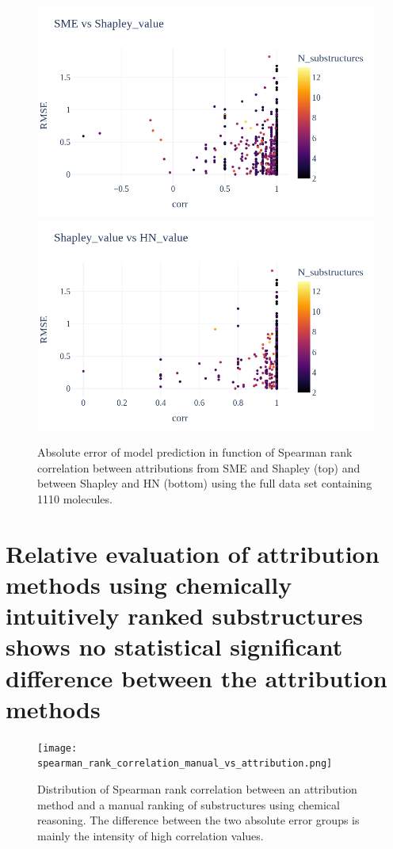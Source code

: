 \begin{figure}[h]
    \centering
    \includegraphics[scale=0.35]{../data/images/esol_rank_vs_AE_SME_Shapley_combined.png}
    \includegraphics[scale=0.35]{../data/images/esol_rank_vs_AE_Shapley_HN_combined.png}
    \caption{Absolute error of model prediction in function of Spearman rank correlation between 
        attributions from SME and Shapley (top) and between Shapley and HN (bottom) using the full 
        data set containing 1110 molecules.
    }
\end{figure}


\section{Relative evaluation of attribution methods using chemically intuitively ranked substructures shows no statistical
significant difference between the attribution methods}

\begin{figure}[h]
    \centering
    \texttt{[image: spearman\_rank\_correlation\_manual\_vs\_attribution.png]}
    \caption{Distribution of Spearman rank correlation between an attribution method 
        and a manual ranking of substructures using chemical reasoning. The difference 
        between the two absolute error groups is mainly the intensity of high 
        correlation values.
    }
    \label{fig:spearman_corr_manual}
\end{figure}


